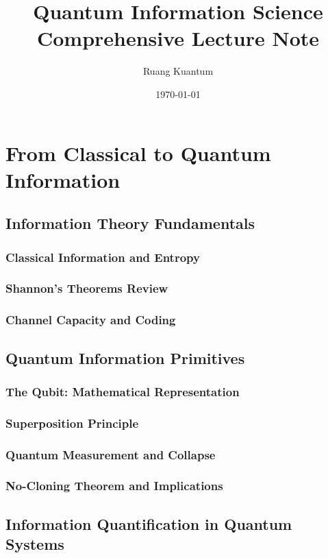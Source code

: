\documentclass[12pt,a4paper]{book}
\title{{\Huge Quantum Information Science}\\
{\Large Comprehensive Lecture Note}}
\author{Ruang Kuantum}
\date{\today}
\begin{document}
\frontmatter
\maketitle

\tableofcontents

\mainmatter
\chapter{From Classical to Quantum Information}

\section{Information Theory Fundamentals}
\subsection{Classical Information and Entropy}
\subsection{Shannon's Theorems Review}
\subsection{Channel Capacity and Coding}

\section{Quantum Information Primitives}
\subsection{The Qubit: Mathematical Representation}
\subsection{Superposition Principle}
\subsection{Quantum Measurement and Collapse}
\subsection{No-Cloning Theorem and Implications}

\section{Information Quantification in Quantum Systems}
\end{document}
